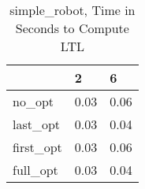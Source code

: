 \begin{table}
\caption{simple\_robot, Time in Seconds to Compute LTL}
\label{simple_robot_LTL_time}
\begin{tabular}{lll}
\toprule
 & 2 & 6 \\
\midrule
no\_opt & 0.03 & 0.06 \\
last\_opt & 0.03 & 0.04 \\
first\_opt & 0.03 & 0.06 \\
full\_opt & 0.03 & 0.04 \\
\bottomrule
\end{tabular}
\end{table}
